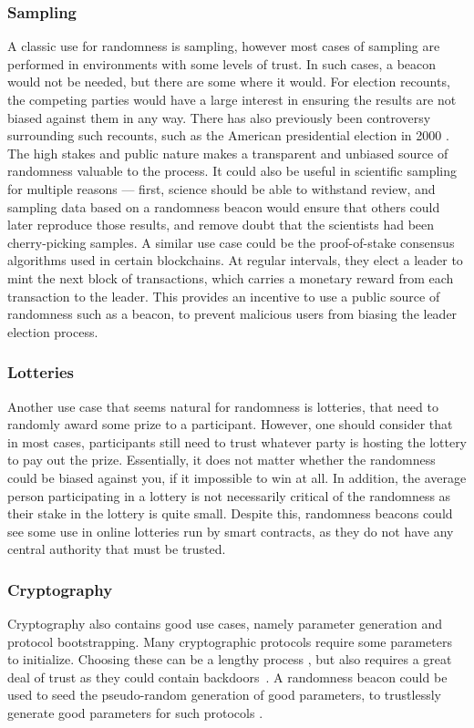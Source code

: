 \subsubsection{Sampling}
A classic use for randomness is sampling, however most cases of sampling are performed in environments with some levels of trust. In such cases, a beacon would not be needed, but there are some where it would. For election recounts, the competing parties would have a large interest in ensuring the results are not biased against them in any way. There has also previously been controversy surrounding such recounts, such as the American presidential election in 2000 . The high stakes and public nature makes a transparent and unbiased source of randomness valuable to the process.
It could also be useful in scientific sampling for multiple reasons --- first, science should be able to withstand review, and sampling data based on a randomness beacon would ensure that others could later reproduce those results, and remove doubt that the scientists had been cherry-picking samples.
A similar use case could be the proof-of-stake consensus algorithms used in certain blockchains. At regular intervals, they elect a leader to mint the next block of transactions, which carries a monetary reward from each transaction to the leader. This provides an incentive to use a public source of randomness such as a beacon, to prevent malicious users from biasing the leader election process.

\subsubsection{Lotteries}
Another use case that seems natural for randomness is lotteries, that need to randomly award some prize to a participant. However, one should consider that in most cases, participants still need to trust whatever party is hosting the lottery to pay out the prize. Essentially, it does not matter whether the randomness could be biased against you, if it impossible to win at all.
In addition, the average person participating in a lottery is not necessarily critical of the randomness as their stake in the lottery is quite small.
Despite this, randomness beacons could see some use in online lotteries run by smart contracts, as they do not have any central authority that must be trusted.

\subsubsection{Cryptography}
Cryptography also contains good use cases, namely parameter generation and protocol bootstrapping. Many cryptographic protocols require some parameters to initialize. Choosing these can be a lengthy process , but also requires a great deal of trust as they could contain backdoors~\cite{nist2014backdoor}. A randomness beacon could be used to seed the pseudo-random generation of good parameters, to trustlessly generate good parameters for such protocols .

